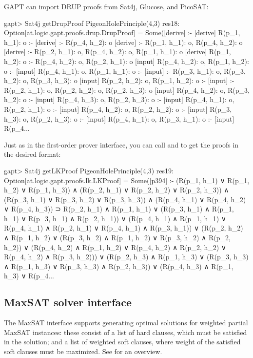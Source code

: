 \documentclass[a4paper,11pt]{article}
\newcommand{\cli}[1]{{\ttfamily {#1}}}
\begin{document}
GAPT can import DRUP proofs from Sat4j, Glucose, and PicoSAT:
\begin{clilisting}
gapt> Sat4j getDrupProof PigeonHolePrinciple(4,3)
res18: Option[at.logic.gapt.proofs.drup.DrupProof] =
Some([derive]  :-
[derive] R(p_1, h_1): o :-
[derive]  :- R(p_4, h_2): o
[derive]  :- R(p_1, h_1): o, R(p_4, h_2): o
[derive]  :- R(p_2, h_1): o, R(p_4, h_2): o, R(p_1, h_1): o
[derive] R(p_1, h_2): o :- R(p_4, h_2): o, R(p_2, h_1): o
[input] R(p_4, h_2): o, R(p_1, h_2): o :-
[input] R(p_4, h_1): o, R(p_1, h_1): o :-
[input]  :- R(p_3, h_1): o, R(p_3, h_2): o, R(p_3, h_3): o
[input] R(p_2, h_2): o, R(p_1, h_2): o :-
[input]  :- R(p_2, h_1): o, R(p_2, h_2): o, R(p_2, h_3): o
[input] R(p_4, h_2): o, R(p_3, h_2): o :-
[input] R(p_4, h_3): o, R(p_2, h_3): o :-
[input] R(p_4, h_1): o, R(p_2, h_1): o :-
[input] R(p_4, h_2): o, R(p_2, h_2): o :-
[input] R(p_3, h_3): o, R(p_2, h_3): o :-
[input] R(p_4, h_1): o, R(p_3, h_1): o :-
[input] R(p_4...
\end{clilisting}

Just as in the first-order prover interface, you can call
\cli{getRobinsonProof} and \cli{getLKProof} to get the proofs in the desired
format:
\begin{clilisting}
gapt> Sat4j getLKProof PigeonHolePrinciple(4,3)
res19: Option[at.logic.gapt.proofs.lk.LKProof] =
Some([p394]
:-
(R(p_1, h_1) ∨ R(p_1, h_2) ∨ R(p_1, h_3)) ∧
    (R(p_2, h_1) ∨ R(p_2, h_2) ∨ R(p_2, h_3)) ∧
    (R(p_3, h_1) ∨ R(p_3, h_2) ∨ R(p_3, h_3)) ∧
    (R(p_4, h_1) ∨ R(p_4, h_2) ∨ R(p_4, h_3)) ⊃
  R(p_2, h_1) ∧ R(p_1, h_1) ∨
    (R(p_3, h_1) ∧ R(p_1, h_1) ∨ R(p_3, h_1) ∧ R(p_2, h_1)) ∨
    (R(p_4, h_1) ∧ R(p_1, h_1) ∨
      R(p_4, h_1) ∧ R(p_2, h_1) ∨
      R(p_4, h_1) ∧ R(p_3, h_1)) ∨
    (R(p_2, h_2) ∧ R(p_1, h_2) ∨
      (R(p_3, h_2) ∧ R(p_1, h_2) ∨ R(p_3, h_2) ∧ R(p_2, h_2)) ∨
      (R(p_4, h_2) ∧ R(p_1, h_2) ∨
        R(p_4, h_2) ∧ R(p_2, h_2) ∨
        R(p_4, h_2) ∧ R(p_3, h_2))) ∨
    (R(p_2, h_3) ∧ R(p_1, h_3) ∨
      (R(p_3, h_3) ∧ R(p_1, h_3) ∨ R(p_3, h_3) ∧ R(p_2, h_3)) ∨
      (R(p_4, h_3) ∧ R(p_1, h_3) ∨
        R(p_4...
\end{clilisting}

\subsection{MaxSAT solver interface}

The MaxSAT interface supports generating optimal solutions for weighted partial
MaxSAT instances: these consist of a list of hard clauses, which must be
satisfied in the solution; and a list of weighted soft clauses, where weight of
the satisfied soft clauses must be maximized.  See \cite{Argelich2008First}
for an overview.
\end{document}
